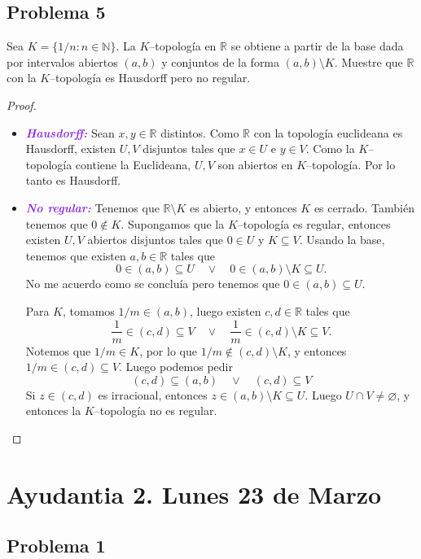 \documentclass{article}
\theoremstyle{definition}
\theoremstyle{remark}
\numberwithin{equation}{section}
\newcommand{\N}{\mathbb{N}}
\newcommand{\R}{\mathbb{R}}
\newcommand{\wea}[1]{\textcolor{BlueViolet}{\textbf{\emph{#1}}}}
\begin{document}
\subsection{Problema 5}
Sea $K = \{1/n \colon n \in \N\}$. La $K$--topología en $\R$ se obtiene a partir de la base dada por intervalos abiertos $(a,b)$ y conjuntos de la forma $(a,b) \setminus K$.
Muestre que $\R$ con la $K$--topología es Hausdorff pero no regular.
\begin{proof}
  \begin{itemize}
    \item \wea{Hausdorff:}
    Sean $x,y \in \R$ distintos. Como $\R$ con la topología euclideana es Hausdorff, existen $U,V$ disjuntos tales que $x \in U$ e $y \in V$. Como la $K$--topología contiene la Euclideana, $U,V$ son abiertos en $K$--topología. Por lo tanto es Hausdorff.

    \item \wea{No regular:}
    Tenemos que $\R \setminus K$ es abierto, y entonces $K$ es cerrado. También tenemos que $0 \notin K$. Supongamos que la $K$--topología es regular, entonces existen $U,V$ abiertos disjuntos tales que $0 \in U$ y $K \subseteq V$. Usando la base, tenemos que existen $a,b \in \R$ tales que
    \[0 \in (a,b) \subseteq U \quad\lor\quad 0 \in (a,b) \setminus K \subseteq U.\]
    No me acuerdo como se concluía pero tenemos que $0 \in (a,b) \subseteq U$.

    Para $K$, tomamos $1/m \in (a,b)$, luego existen $c,d \in \R$ tales que
    \[\frac 1m \in (c,d) \subseteq V \quad\lor\quad \frac 1m \in (c,d) \setminus K \subseteq V.\]
    Notemos que $1/m \in K$, por lo que $1/m \notin (c,d) \setminus K$, y entonces $1/m \in (c,d) \subseteq V$. Luego podemos pedir
    $$(c,d) \subseteq (a,b) \quad\lor\quad (c,d) \subseteq V$$
    Si $z \in (c,d)$ es irracional, entonces $z \in (a,b) \setminus K \subseteq U$. Luego $U \cap V \neq \varnothing$, y entonces la $K$--topología no es regular.
  \end{itemize}
\end{proof}

\newpage
\section{Ayudantia 2. Lunes 23 de Marzo}

\subsection{Problema 1}
\end{document}
